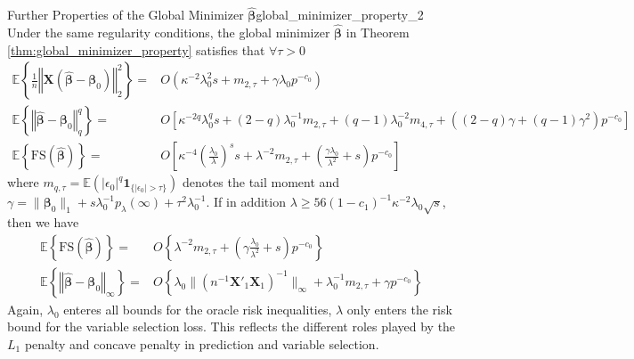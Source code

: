 \documentclass[twoside]{article}
\begin{document}
\begin{theorem}{Further Properties of the Global Minimizer $\hat{\boldsymbol{\beta}}$}{global_minimizer_property_2}
    Under the same regularity conditions, the global minimizer $\hat{\boldsymbol{\beta}}$ in Theorem \ref{thm:global_minimizer_property} satisfies that $\forall \tau >0$
    \begin{align}
        \mathbb{E}\left\{ \frac{1}{n}\left\Vert \mathbf{X}\left( \hat{\boldsymbol{\beta}} -\boldsymbol{\beta}_0 \right) \right\Vert^2 _2 \right\} =& O\left(\kappa^{-2}\lambda^2_0s +m_{2,\tau}+\gamma \lambda_0p^{-c_0}\right) \\
        \mathbb{E}\left\{ \left\Vert \hat{\boldsymbol{\beta}}-\boldsymbol{\beta}_0 \right\Vert^q _q \right\} = &O\left[ \kappa^{-2q}\lambda_0^q s + (2-q)\lambda_0^{-1}m_{2,\tau}+(q-1)\lambda^{-2}_0m_{4,\tau} + \left( (2-q)\gamma + (q-1)\gamma^2 \right)p^{-c_0} \right] \\
        \mathbb{E}\left\{\mathrm{FS}\left(\hat{\boldsymbol{\beta}} \right) \right\} =& O\left[ \kappa^{-4}\left( \frac{\lambda_0}{\lambda} \right)^s s +\lambda^{-2}m_{2,\tau} + \left(\frac{\gamma\lambda_0}{\lambda^2}+s\right)p^{-c_0} \right]
    \end{align}
    where $m_{q,\tau}=\mathbb{E}\left( \lvert \epsilon_0 \rvert^q \mathbf{1}_{ \{\lvert \epsilon_0 \rvert>\tau \} } \right)$ denotes the tail moment and $\gamma = \lVert \boldsymbol{\beta}_0 \rVert _1 + s\lambda_0^{-1}p_{\lambda}(\infty) + \tau^2 \lambda_0^{-1}$. If in addition $\lambda\geq 56(1-c_1)^{-1}\kappa^{-2}\lambda_0 \sqrt{s}$, then we  have 
    \begin{align*}
        \mathbb{E}\left\{\mathrm{FS}\left(\hat{\boldsymbol{\beta}} \right) \right\} =& O\left\{ \lambda^{-2} m_{2,\tau} + \left(\gamma \frac{\lambda_0}{\lambda^2} +s\right) p^{-c_0} \right\} \\
        \mathbb{E}\left\{ \left\Vert \hat{\boldsymbol{\beta}}-\boldsymbol{\beta}_0 \right\Vert _{\infty} \right\} =& O\left\{ \lambda_0 \lVert (n^{-1}\mathbf{X}'_1\mathbf{X}_1)^{-1} \rVert _{\infty} + \lambda_0^{-1}m_{2,\tau} + \gamma p^{-c_0} \right\}
    \end{align*}
    Again, $\lambda_0$  enteres all bounds for the oracle risk inequalities, $\lambda$ only enters the risk bound for the variable selection loss. This reflects the different roles played by the $L_1$ penalty and concave penalty in prediction and variable selection.
\end{theorem}

\newpage


\end{document}
